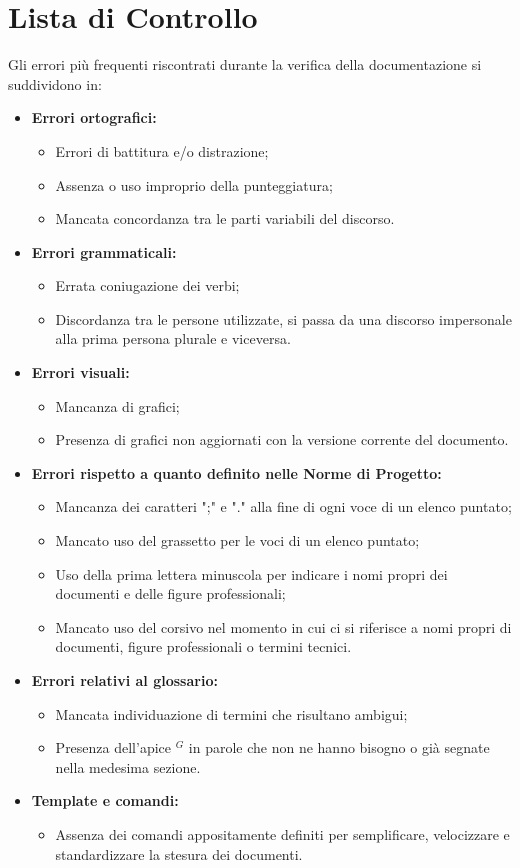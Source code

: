 \section{Lista di Controllo}
\label{lista_controllo}
Gli errori più frequenti riscontrati durante la verifica della documentazione si suddividono in:
\begin{itemize}
	\item \textbf{Errori ortografici:}
	\begin{itemize}
		\item Errori di battitura e/o distrazione;
		\item Assenza o uso improprio della punteggiatura;
		\item Mancata concordanza tra le parti variabili del discorso.
	\end{itemize}
	\item \textbf{Errori grammaticali:}
	\begin{itemize}
		\item Errata coniugazione dei verbi;
		\item Discordanza tra le persone utilizzate, si passa da una discorso impersonale alla prima persona plurale e viceversa.
	\end{itemize}
	\item \textbf{Errori visuali:}
	\begin{itemize}
		\item Mancanza di grafici;
		\item Presenza di grafici non aggiornati con la versione corrente del documento.
	\end{itemize}
	\item \textbf{Errori rispetto a quanto definito nelle Norme di Progetto:}
	\begin{itemize}
		\item Mancanza dei caratteri ";" e "." alla fine di ogni voce di un elenco puntato;
		\item Mancato uso del grassetto per le voci di un elenco puntato;
		\item Uso della prima lettera minuscola per indicare i nomi propri dei documenti e delle figure professionali;
		\item Mancato uso del corsivo nel momento in cui ci si riferisce a nomi propri di documenti, figure professionali o termini tecnici.
	\end{itemize}
	\item \textbf{Errori relativi al glossario:}
	\begin{itemize}
		\item Mancata individuazione di termini che risultano ambigui;
		\item Presenza dell'apice $^G$ in parole che non ne hanno bisogno o già segnate nella medesima sezione.
	\end{itemize}
	\item \textbf{Template e comandi:}
	\begin{itemize}
		\item Assenza dei comandi appositamente definiti per semplificare, velocizzare e standardizzare la stesura dei documenti.
	\end{itemize}
\end{itemize}